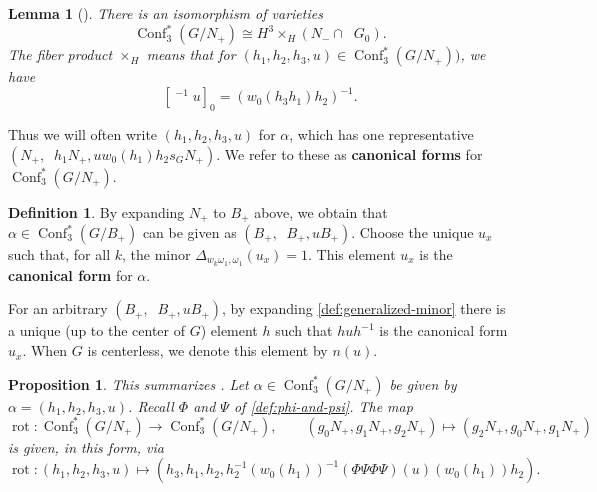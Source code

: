 \documentclass{amsart}
\theoremstyle{plain}
\newtheorem{lemma}[theorem]{Lemma}
\newtheorem{proposition}[theorem]{Proposition}
\theoremstyle{definition}
\newtheorem{definition}[theorem]{Definition}
\theoremstyle{remark}
\newcommand{\defined}[1]{\textbf{#1}}
\newcommand{\fundamentalweight}{\omega}
\newcommand{\genminoryz}[3]{\Delta_{{#1} \fundamentalweight_{#3}, {#2}%
    \fundamentalweight_{#3}}}
\newcommand{\lifttoG}[1]{{\mathop{\overline{#1}}}}
\DeclareMathOperator{\Conf}{Conf}
\begin{document}
  \begin{lemma}[{\cite[Lemma~5.8, Proposition~5.9]{zickert2016}}]
    \label{lem:canonical-form-for-conf_3_star}
    There is an isomorphism of varieties \[ \Conf_3^{\ast}(G/N_{+})
      \cong H^3 \times_{H} (N_{-} \cap \lifttoG{w_0} G_0). \] The fiber
    product $\times_{H}$ means that for $(h_1, h_2, h_3, u) \in
    \Conf_3^{\ast}(G/N_{+}))$, we have \[ [\lifttoG{w_0}^{-1} u]_{0} =
      (w_0(h_3 h_1) h_2)^{-1}. \]
  \end{lemma}

  Thus we will often write $(h_1, h_2, h_3, u)$ for $\alpha$, which has
  one representative $(N_{+}, \lifttoG{w_0} h_1 N_{+}, u w_0(h_1) h_2
  s_G N_{+})$. We refer to these as \defined{canonical forms} for
  $\Conf_3^{\ast}(G/N_{+})$.

  \begin{definition}
    \label{rem:canonical-form-for-B-cosets}
    By expanding $N_{+}$ to $B_{+}$ above, we obtain that $\alpha \in
    \Conf_3^{\ast}(G/B_{+})$ can be given as $(B_{+}, \lifttoG{w_0}
    B_{+}, u B_{+})$. Choose the unique $u_x$ such that, for all $k$,
    the minor $\genminoryz{w_k}{}{1}(u_x) = 1$. This element $u_x$ is
    the \defined{canonical form} for $\alpha$.

    For an arbitrary $(B_{+}, \lifttoG{w_0} B_{+}, u B_{+})$, by
    expanding \cref{def:generalized-minor} there is a unique (up to the
    center of $G$) element $h$ such that $h u h^{-1}$ is the canonical
    form $u_x$. When $G$ is centerless, we denote this element by
    $n(u)$.
  \end{definition}

  \begin{proposition}
    \label{prop:Phi-Psi-and-rot}
    This summarizes \cite[Proposition~5.10]{zickert2016}. Let $\alpha
    \in \Conf_3^{\ast}(G/N_{+})$ be given by $\alpha = (h_1, h_2, h_3,
    u)$. Recall $\Phi$ and $\Psi$ of \cref{def:phi-and-psi}. The map \[
      \operatorname{rot}: \Conf_3^{\ast}(G/N_{+}) \to
      \Conf_3^{\ast}(G/N_{+}), \qquad (g_0 N_{+}, g_1 N_{+}, g_2 N_{+})
      \mapsto (g_2 N_{+}, g_0 N_{+}, g_1 N_{+}) \] is given, in this
    form, via \[ \operatorname{rot} : (h_1, h_2, h_3, u) \mapsto (h_3,
      h_1, h_2, h_2^{-1} (w_0(h_1))^{-1} (\Phi \Psi \Phi \Psi)(u)
      (w_0(h_1)) h_2). \]
  \end{proposition}
\end{document}
